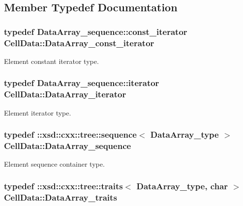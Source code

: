 \subsection{Member Typedef Documentation}
\hypertarget{classCellData_a8213ea10f002fac23b5555ca0b2b2a21}{
\subsubsection[{Data\+Array\+\_\+const\+\_\+iterator}]{\setlength{\rightskip}{0pt plus 5cm}typedef Data\+Array\+\_\+sequence\+::const\+\_\+iterator {\bf Cell\+Data\+::\+Data\+Array\+\_\+const\+\_\+iterator}}}\label{classCellData_a8213ea10f002fac23b5555ca0b2b2a21}


Element constant iterator type. 

\hypertarget{classCellData_abe0f5b0713690cc81703132bcdccd51f}{
\subsubsection[{Data\+Array\+\_\+iterator}]{\setlength{\rightskip}{0pt plus 5cm}typedef Data\+Array\+\_\+sequence\+::iterator {\bf Cell\+Data\+::\+Data\+Array\+\_\+iterator}}}\label{classCellData_abe0f5b0713690cc81703132bcdccd51f}


Element iterator type. 

\hypertarget{classCellData_a52b0c8e18ccdb06ed9e6ae76cd809c4a}{
\subsubsection[{Data\+Array\+\_\+sequence}]{\setlength{\rightskip}{0pt plus 5cm}typedef \+::xsd\+::cxx\+::tree\+::sequence$<$ {\bf Data\+Array\+\_\+type} $>$ {\bf Cell\+Data\+::\+Data\+Array\+\_\+sequence}}}\label{classCellData_a52b0c8e18ccdb06ed9e6ae76cd809c4a}


Element sequence container type. 

\hypertarget{classCellData_a03e76eec5af05a6ac5512e9cb80300bd}{
\subsubsection[{Data\+Array\+\_\+traits}]{\setlength{\rightskip}{0pt plus 5cm}typedef \+::xsd\+::cxx\+::tree\+::traits$<$ {\bf Data\+Array\+\_\+type}, char $>$ {\bf Cell\+Data\+::\+Data\+Array\+\_\+traits}}}\label{classCellData_a03e76eec5af05a6ac5512e9cb80300bd}


